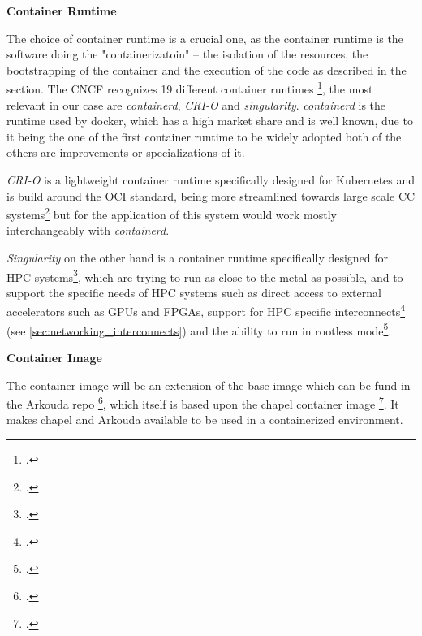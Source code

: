 


\textbf{Container Runtime}
\label{asp:container_runtime}

The choice of container runtime is a crucial one, as the container runtime is the software doing the "containerizatoin" --
the isolation of the resources, the bootstrapping of the container and the execution of the code as described in the  section.
The \ac{CNCF} recognizes 19 different container runtimes \footcite{cncf[cloudnativecomputingfoundation]CNCFLandscape},
the most relevant in our case are \textit{containerd}, \textit{\ac{CRI-O}} and \textit{singularity}.
\textit{containerd} is the runtime used by docker, which has a high market share and is well known,
due to it being the one of the first container runtime to be widely adopted both of the others are improvements or specializations of it.

\textit{\ac{CRI-O}} is a lightweight container runtime specifically designed for Kubernetes and is build around the \ac{OCI} standard,
being more streamlined towards large scale \ac{CC} systems\footcite{crioCrioCrio2024} but for the application of this system would
work mostly interchangeably with \textit{containerd}.

\textit{Singularity} on the other hand is a container runtime specifically designed for \ac{HPC} systems\footcite{singularity-docsIntroductionSingularitySingularity},
which are trying to run as close to the metal as possible, and to support the specific needs of \ac{HPC} systems
such as direct access to external accelerators such as \ac{GPU}s and \ac{FPGA}s, support for \ac{HPC} specific interconnects\footcite{uni.luULHPCTutorial} (see \ref{sec:networking_interconnects}) and the ability to run
in \gls{rootless} mode\footcite{singularity-docsFakerootFeatureSingularity}.


\textbf{Container Image}
\label{sec:container_image}

The container image will be an extension of the base image which
can be fund in the  Arkouda repo \footcite{arkouda-repoArkoudacontribArkoudadockerMain},
which itself is based upon the chapel container image \footcite{chapelChapelProfileDocker}.
It makes chapel and Arkouda available to be used in a containerized environment.


